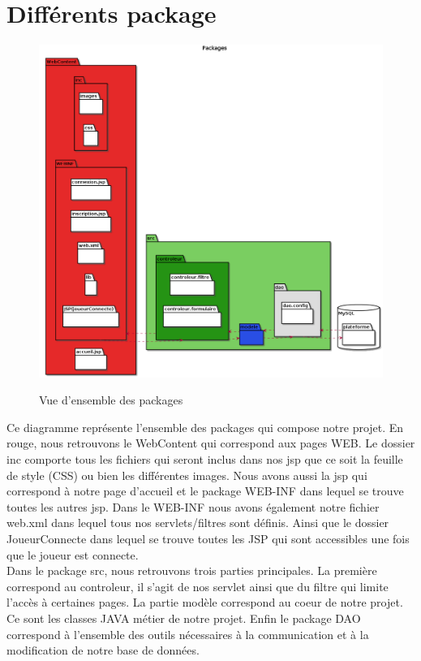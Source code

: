 \section{Différents package}

\begin{figure}[H]
  \center
  \includegraphics[scale=0.35]{../graph/packages.png} \\
  \caption{Vue d'ensemble des packages}
\end{figure}

Ce diagramme représente l'ensemble des packages qui compose notre projet. En rouge, nous retrouvons le WebContent qui correspond aux pages WEB. Le dossier inc comporte tous les fichiers qui seront inclus dans nos jsp que ce soit la feuille de style (CSS) ou bien les différentes images. Nous avons aussi la jsp qui correspond à notre page d’accueil et le package WEB-INF dans lequel se trouve toutes les autres jsp. Dans le WEB-INF nous avons également notre fichier web.xml dans lequel tous nos servlets/filtres sont définis. Ainsi que le dossier JoueurConnecte dans lequel se trouve toutes les JSP qui sont accessibles une fois que le joueur est connecte. \\

Dans le package src, nous retrouvons trois parties principales. La première correspond au controleur, il s'agit de nos servlet ainsi que du filtre qui limite l’accès à certaines pages. La partie modèle correspond au coeur de notre projet. Ce sont les classes JAVA métier de notre projet. Enfin le package DAO correspond à l'ensemble des outils nécessaires à la communication et à la modification de notre base de données. \\

